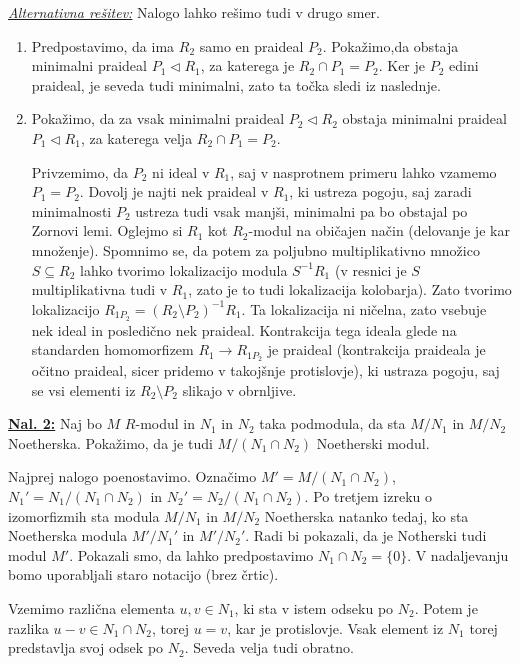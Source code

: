 \documentclass[a4paper, 12pt]{article}
\newcommand{\subideal}{\vartriangleleft}
\begin{document}
\underline{\textit{Alternativna rešitev:}} Nalogo lahko rešimo tudi v drugo smer.
\begin{enumerate}[label=(\alph*)]
	\item Predpostavimo, da ima $R_2$ samo en praideal $P_2$. Pokažimo,da obstaja minimalni praideal $P_1 \subideal R_1$, za katerega je $R_2 \cap P_1 = P_2$. Ker je $P_2$ edini praideal, je seveda tudi minimalni, zato ta točka sledi iz naslednje.
	\item Pokažimo, da za vsak minimalni praideal $P_2 \subideal R_2$ obstaja minimalni praideal $P_1 \subideal R_1$, za katerega velja $R_2 \cap P_1 = P_2$.
	
	Privzemimo, da $P_2$ ni ideal v $R_1$, saj v nasprotnem primeru lahko vzamemo $P_1 = P_2$. Dovolj je najti nek praideal v $R_1$, ki ustreza pogoju, saj zaradi minimalnosti $P_2$ ustreza tudi vsak manjši, minimalni pa bo obstajal po Zornovi lemi.
	Oglejmo si $R_1$ kot $R_2$-modul na običajen način (delovanje je kar množenje). Spomnimo se, da potem za poljubno multiplikativno množico $S \subseteq R_2$ lahko tvorimo lokalizacijo modula $S^{-1}R_1$ (v resnici je $S$ multiplikativna tudi v $R_1$, zato je to tudi lokalizacija kolobarja). Zato tvorimo lokalizacijo $R_{1 P_2} = (R_2 \setminus P_2)^{-1}R_1$. Ta lokalizacija ni ničelna, zato vsebuje nek ideal in posledično nek praideal. Kontrakcija tega ideala glede na standarden homomorfizem $R_1 \to R_{1 P_2}$ je praideal (kontrakcija praideala je očitno praideal, sicer pridemo v takojšnje protislovje), ki ustraza pogoju, saj se vsi elementi iz $R_2 \setminus P_2$ slikajo v obrnljive.
\end{enumerate}


\underline{\textbf{Nal. 2:}}
Naj bo $M$ $R$-modul in $N_1$ in $N_2$ taka podmodula, da sta $M/N_1$ in $M/N_2$ Noetherska. Pokažimo, da je tudi $M/(N_1 \cap N_2)$ Noetherski modul.

Najprej nalogo poenostavimo. Označimo $M' = M/(N_1 \cap N_2)$, $N_1' = N_1/(N_1 \cap N_2)$ in $N_2' = N_2/(N_1 \cap N_2)$. Po tretjem izreku o izomorfizmih sta modula $M/N_1$ in $M/N_2$ Noetherska natanko tedaj, ko sta Noetherska modula $M'/N_1'$ in $M'/N_2'$. Radi bi pokazali, da je Notherski tudi modul $M'$.  Pokazali smo, da lahko predpostavimo $N_1 \cap N_2 = \lbrace 0 \rbrace$. V nadaljevanju bomo uporabljali staro notacijo (brez črtic).

Vzemimo različna elementa $u,v \in N_1$, ki sta v istem odseku po $N_2$. Potem je razlika $u-v \in N_1 \cap N_2$, torej $u=v$, kar je protislovje. Vsak element iz $N_1$ torej predstavlja svoj odsek po $N_2$. Seveda velja tudi obratno.
\end{document}
